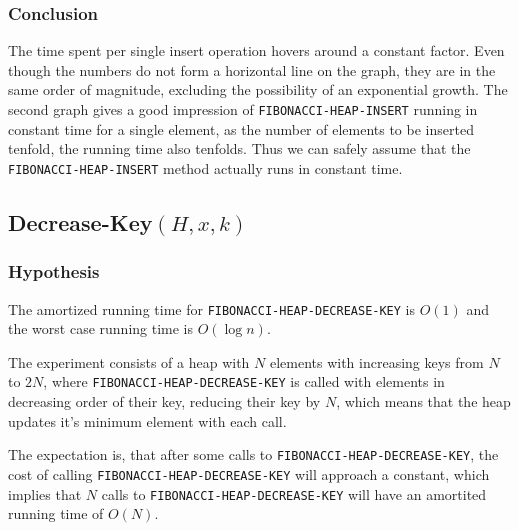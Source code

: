 \documentclass[a4paper,oneside,11pt]{article}
\begin{document}
\begin{itemize}
\subsubsection*{Conclusion}
The time spent per single insert operation hovers around a constant factor. Even though the numbers do not form a horizontal line on the graph, they are in the same order of magnitude, excluding the possibility of an exponential growth. The second graph gives a good impression of \texttt{FIBONACCI-HEAP-INSERT} running in constant time for a single element, as the number of elements to be inserted tenfold, the running time also tenfolds. Thus we can safely assume that the \texttt{FIBONACCI-HEAP-INSERT} method actually runs in constant time.

\subsection*{Decrease-Key$(H,x,k)$}
\subsubsection*{Hypothesis}

The amortized running time for \texttt{FIBONACCI-HEAP-DECREASE-KEY} is $O(1)$ and the worst case running time is $O(\log n)$.

The experiment consists of a heap with $N$ elements with increasing keys from $N$ to $2N$, where \texttt{FIBONACCI-HEAP-DECREASE-KEY} is called with elements in decreasing order of their key, reducing their key by $N$, which means that the heap updates it's minimum element with each call.

The expectation is, that after some calls to \texttt{FIBONACCI-HEAP-DECREASE-KEY}, the cost of calling \texttt{FIBONACCI-HEAP-DECREASE-KEY} will approach a constant, which implies that $N$ calls to \texttt{FIBONACCI-HEAP-DECREASE-KEY} will have an amortited running time of $O(N)$.

\end{itemize}
\end{document}
